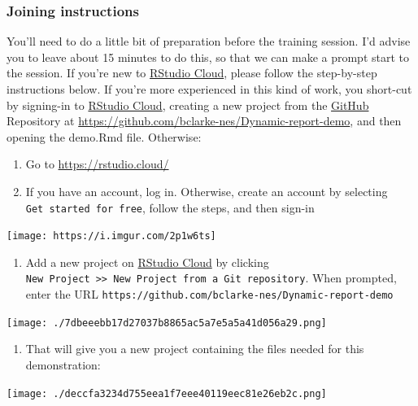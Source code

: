 \documentclass[
]{article}
\providecommand{\tightlist}{%
  \setlength{\itemsep}{0pt}\setlength{\parskip}{0pt}}
\begin{document}
\hypertarget{joining-instructions}{%
\subsubsection{Joining instructions}\label{joining-instructions}}

You'll need to do a little bit of preparation before the training
session. I'd advise you to leave about 15 minutes to do this, so that we
can make a prompt start to the session. If you're new to
\href{https://rstudio.cloud}{RStudio Cloud}, please follow the
step-by-step instructions below. If you're more experienced in this kind
of work, you short-cut by signing-in to
\href{https://rstudio.cloud/}{RStudio Cloud}, creating a new project
from the
\href{https://unito.io/blog/guide-to-github-for-project-managers/}{GitHub}
Repository at \url{https://github.com/bclarke-nes/Dynamic-report-demo},
and then opening the demo.Rmd file. Otherwise:

\begin{enumerate}
\def\labelenumi{\arabic{enumi}.}
\item
  Go to \url{https://rstudio.cloud/}
\item
  If you have an account, log in. Otherwise, create an account by
  selecting \texttt{Get\ started\ for\ free}, follow the steps, and then
  sign-in
\end{enumerate}

\texttt{[image: https://i.imgur.com/2p1w6ts]}

\begin{enumerate}
\def\labelenumi{\arabic{enumi}.}
\setcounter{enumi}{2}
\tightlist
\item
  Add a new project on \href{https://rstudio.cloud}{RStudio Cloud} by
  clicking
  \texttt{New\ Project\ \textgreater{}\textgreater{}\ New\ Project\ from\ a\ Git\ repository}.
  When prompted, enter the URL
  \texttt{https://github.com/bclarke-nes/Dynamic-report-demo}
\end{enumerate}

\texttt{[image: ./7dbeeebb17d27037b8865ac5a7e5a5a41d056a29.png]}

\begin{enumerate}
\def\labelenumi{\arabic{enumi}.}
\setcounter{enumi}{3}
\tightlist
\item
  That will give you a new project containing the files needed for this
  demonstration:
\end{enumerate}

\texttt{[image: ./deccfa3234d755eea1f7eee40119eec81e26eb2c.png]}
\end{document}
